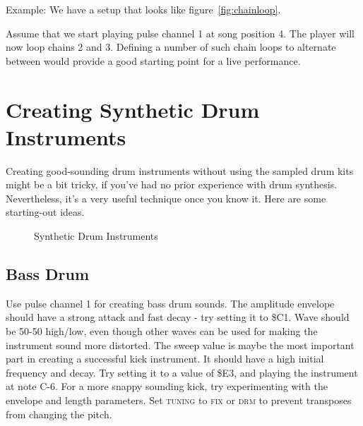 Example: We have a setup that looks like figure~\ref{fig:chainloop}.

Assume that we start playing pulse channel 1 at song position 4. The player will now loop chains 2 and 3. Defining a number of such chain loops to alternate between would provide a good starting point for a live performance.

\section{Creating Synthetic Drum Instruments}

Creating good-sounding drum instruments without using the sampled drum kits might be a bit tricky, if you've had no prior experience with drum synthesis. Nevertheless, it's a very useful technique once you know it. Here are some starting-out ideas.

\begin{figure}[hbtp]
	\centering
	\qquad

	\qquad

	\qquad

	\caption{Synthetic Drum Instruments}
	\label{fig:instr-examples}
\end{figure}

\subsection{Bass Drum}

Use pulse channel 1 for creating bass drum sounds. The amplitude envelope should have a strong attack and fast decay - try setting it to \$C1. Wave should be 50-50 high/low, even though other waves can be used for making the instrument sound more distorted. The sweep value is maybe the most important part in creating a successful kick instrument. It should have a high initial frequency and decay. Try setting it to a value of \$E3, and playing the instrument at note C-6. For a more snappy sounding kick, try experimenting with the envelope and length parameters. Set \textsc{tuning} to \textsc{fix} or \textsc{drm} to prevent transposes from changing the pitch.

